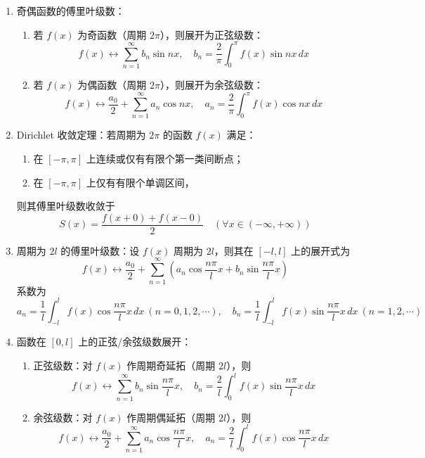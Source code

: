 \documentclass[UTF8]{ctexart}
\theoremstyle{remark}
\begin{document}
\begin{enumerate}
	\item 奇偶函数的傅里叶级数：  
	\begin{enumerate}
		\item 若 \(f(x)\) 为奇函数（周期 \(2\pi\)），则展开为正弦级数：  
		\[
		f(x) \leftrightarrow \sum_{n=1}^{\infty} b_n \sin nx, \quad b_n = \frac{2}{\pi} \int_{0}^{\pi} f(x) \sin nx \, dx
		\]
		\item 若 \(f(x)\) 为偶函数（周期 \(2\pi\)），则展开为余弦级数：  
		\[
		f(x) \leftrightarrow \frac{a_0}{2} + \sum_{n=1}^{\infty} a_n \cos nx, \quad a_n = \frac{2}{\pi} \int_{0}^{\pi} f(x) \cos nx \, dx
		\]
	\end{enumerate}
	
	\item Dirichlet 收敛定理：若周期为 \(2\pi\) 的函数 \(f(x)\) 满足：  
	\begin{enumerate}
		\item 在 \([-\pi, \pi]\) 上连续或仅有有限个第一类间断点；  
		\item 在 \([-\pi, \pi]\) 上仅有有限个单调区间，  
	\end{enumerate}  
	则其傅里叶级数收敛于  
	\[
	S(x) = \frac{f(x+0) + f(x-0)}{2} \quad (\forall x \in (-\infty, +\infty))
	\]
	
	\item 周期为 \(2l\) 的傅里叶级数：设 \(f(x)\) 周期为 \(2l\)，则其在 \([-l, l]\) 上的展开式为  
	\[
	f(x) \leftrightarrow \frac{a_0}{2} + \sum_{n=1}^{\infty} \left(a_n \cos \frac{n\pi}{l}x + b_n \sin \frac{n\pi}{l}x\right)
	\]  
	系数为  
	\[
	a_n = \frac{1}{l} \int_{-l}^{l} f(x) \cos \frac{n\pi}{l}x \, dx \ (n=0,1,2,\cdots), \quad b_n = \frac{1}{l} \int_{-l}^{l} f(x) \sin \frac{n\pi}{l}x \, dx \ (n=1,2,\cdots)
	\]
	
	\item 函数在 \([0, l]\) 上的正弦/余弦级数展开：  
	\begin{enumerate}
		\item 正弦级数：对 \(f(x)\) 作周期奇延拓（周期 \(2l\)），则  
		\[
		f(x) \leftrightarrow \sum_{n=1}^{\infty} b_n \sin \frac{n\pi}{l}x, \quad b_n = \frac{2}{l} \int_{0}^{l} f(x) \sin \frac{n\pi}{l}x \, dx
		\]
		\item 余弦级数：对 \(f(x)\) 作周期偶延拓（周期 \(2l\)），则  
		\[
		f(x) \leftrightarrow \frac{a_0}{2} + \sum_{n=1}^{\infty} a_n \cos \frac{n\pi}{l}x, \quad a_n = \frac{2}{l} \int_{0}^{l} f(x) \cos \frac{n\pi}{l}x \, dx
		\]
	\end{enumerate}
	

\end{enumerate}
\end{document}
